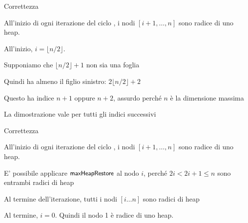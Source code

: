 \begin{frame}{Correttezza}

\vspace{-12pt}
\begin{overprint}

\begin{myboxtitle}
All'inizio di ogni iterazione del ciclo \FOR, i nodi $[i+1, \ldots, n]$ sono radice di uno heap.
\end{myboxtitle}


\begin{myboxtitle}
\BIL
\item All'inizio, $i= \lfloor n/2 \rfloor$. 
\item Supponiamo che $\lfloor n/2 \rfloor+1$ non sia una foglia
\item Quindi ha almeno il figlio sinistro: $2\lfloor n/2 \rfloor+2$
\item Questo ha indice $n+1$ oppure $n+2$, assurdo perché $n$ è la dimensione
massima
\item La dimostrazione vale per tutti gli indici successivi
\EIL 
\end{myboxtitle}

\end{overprint}


\end{frame}

\begin{frame}{Correttezza}

\vspace{-12pt}
\begin{overprint}
\begin{myboxtitle}
All'inizio di ogni iterazione del ciclo \FOR, i nodi $[i+1, \ldots, n]$ sono radice di uno heap.
\end{myboxtitle}

\begin{myboxtitle}
\BIL
\item E' possibile applicare $\textsf{{\small maxHeapRestore}}$ al nodo $i$, perché
$2i < 2i+1 \leq n$ sono entrambi radici di heap
\item Al termine dell'iterazione, tutti i nodi $[i \ldots n]$ sono radici
di heap
\EIL
\end{myboxtitle}

\begin{myboxtitle}
\BIL
\item Al termine, $i=0$. Quindi il nodo 1 è radice di uno heap.
\EIL
\end{myboxtitle}
\end{overprint}

    
\end{frame}

